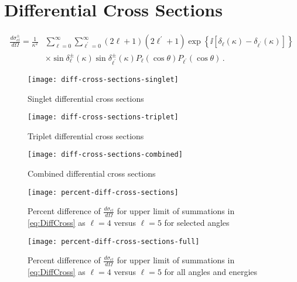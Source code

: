 \documentclass[Dissertation.tex]{subfiles}
\begin{document}
\section{Differential Cross Sections}
\label{sec:diffcross}


\begin{align}
\label{eq:DiffCross}
\nonumber \frac{d\sigma_{el}^\pm}{d\Omega} = \frac{1}{\kappa^2} & \sum_{\ell=0}^\infty \sum_{\ell^\prime=0}^\infty (2\ell+1)(2\ell^\prime+1) \exp\left\{\ii \left[\delta_\ell(\kappa) - \delta_{\ell^\prime}(\kappa) \right] \right\} \\
& \times \sin\delta_\ell^\pm(\kappa) \sin\delta_{\ell^\prime}^\pm(\kappa) P_\ell(\cos\theta) P_{\ell^\prime}(\cos\theta)\,.
\end{align}

\begin{figure}[H]
	\centering
	\texttt{[image: diff-cross-sections-singlet]}
	\caption{Singlet differential cross sections}
	\label{fig:diff-cross-sections-singlet}
\end{figure}

\begin{figure}[H]
	\centering
	\texttt{[image: diff-cross-sections-triplet]}
	\caption{Triplet differential cross sections}
	\label{fig:diff-cross-sections-triplet}
\end{figure}

\begin{figure}[H]
	\centering
	\texttt{[image: diff-cross-sections-combined]}
	\caption{Combined differential cross sections}
	\label{fig:diff-cross-sections-combined}
\end{figure}

\begin{figure}[H]
	\centering
	\texttt{[image: percent-diff-cross-sections]}
	\caption[Percent difference of differential cross sections at selected angles]{Percent difference of $\frac{d\sigma_{el}}{d\Omega}$ for upper limit of summations in \ref{eq:DiffCross} as $\ell = 4$ versus $\ell = 5$ for selected angles}
	\label{fig:percent-diff-cross-sections}
\end{figure}

\begin{figure}[H]
	\centering
	\texttt{[image: percent-diff-cross-sections-full]}
	\caption[Percent difference of differential cross sections at all angles]{Percent difference of $\frac{d\sigma_{el}}{d\Omega}$ for upper limit of summations in \ref{eq:DiffCross} as $\ell = 4$ versus $\ell = 5$ for all angles and energies}
	\label{fig:percent-diff-cross-sections-full}
\end{figure}
\end{document}
